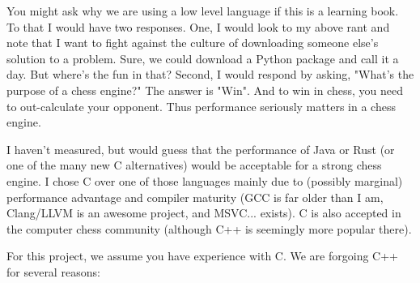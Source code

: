 \documentclass[letterpaper,11pt]{article}
\begin{document}
You might ask why we are using a low level language if this is a learning book. To that I would have two responses. 
One, I would look to my above rant and note that I want to fight against the culture of downloading someone else's solution to a problem. Sure, we could download a Python package and call it a day. But where's the fun in that? Second, I would respond by asking, "What's the purpose of a chess engine?" The answer is "Win". And to win in chess, you need to out-calculate your opponent. Thus performance seriously matters in a chess engine.

I haven't measured, but would guess that the performance of Java or Rust (or one of the many new C alternatives) 
would be acceptable for a strong chess engine. I chose C over one of those languages mainly due to (possibly marginal) 
performance advantage and compiler maturity (GCC is far older than I am, Clang/LLVM is an awesome project, and MSVC... exists). 
C is also accepted in the computer chess community (although C++ is seemingly more popular there).

For this project, we assume you have experience with C.
We are forgoing C++ for several reasons:
\end{document}
